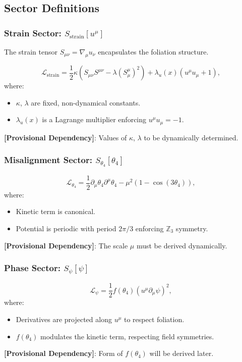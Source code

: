\documentclass[12pt]{article}
\begin{document}
\subsection{Sector Definitions}

\subsubsection{Strain Sector: \( S_{\text{strain}}[u^\mu] \)}
The strain tensor \( S_{\mu\nu} = \nabla_\mu u_\nu \) encapsulates the foliation structure.

\[
\mathcal{L}_{\text{strain}} = \frac{1}{2} \kappa \left( S_{\mu\nu} S^{\mu\nu} - \lambda (S^\mu_\mu)^2 \right) + \lambda_u(x) \left( u^\mu u_\mu + 1 \right),
\]
where:
\begin{itemize}
    \item \( \kappa \), \( \lambda \) are fixed, non-dynamical constants.
    \item \( \lambda_u(x) \) is a Lagrange multiplier enforcing \( u^\mu u_\mu = -1 \).
\end{itemize}
\textbf{[Provisional Dependency]}: Values of \( \kappa \), \( \lambda \) to be dynamically determined.

\subsubsection{Misalignment Sector: \( S_{\theta_4}[\theta_4] \)}
\[
\mathcal{L}_{\theta_4} = \frac{1}{2} \partial_\mu \theta_4 \partial^\mu \theta_4 - \mu^2 \left( 1 - \cos(3 \theta_4) \right),
\]
where:
\begin{itemize}
    \item Kinetic term is canonical.
    \item Potential is periodic with period \( 2\pi/3 \) enforcing \( \mathbb{Z}_3 \) symmetry.
\end{itemize}
\textbf{[Provisional Dependency]}: The scale \( \mu \) must be derived dynamically.

\subsubsection{Phase Sector: \( S_{\psi}[\psi] \)}
\[
\mathcal{L}_{\psi} = \frac{1}{2} f(\theta_4) \left( u^\mu \partial_\mu \psi \right)^2,
\]
where:
\begin{itemize}
    \item Derivatives are projected along \( u^\mu \) to respect foliation.
    \item \( f(\theta_4) \) modulates the kinetic term, respecting field symmetries.
\end{itemize}
\textbf{[Provisional Dependency]}: Form of \( f(\theta_4) \) will be derived later.
\end{document}
